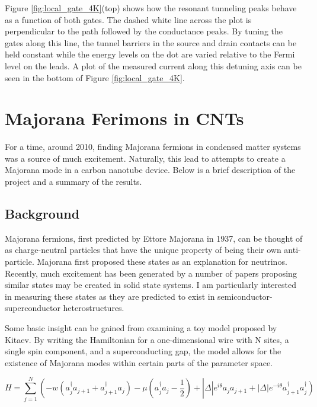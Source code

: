 Figure \ref{fig:local_gate_4K}(top) shows how the resonant tunneling peaks behave as a function of both gates. The dashed white line across the plot is perpendicular to the path followed by the conductance peaks. By tuning the gates along this line, the tunnel barriers in the source and drain contacts can be held constant while the energy levels on the dot are varied relative to the Fermi level on the leads. A plot of the measured current along this detuning axis can be seen in the bottom of Figure \ref{fig:local_gate_4K}.

\section{Majorana Ferimons in CNTs}

For a time, around 2010, finding Majorana fermions in condensed matter systems was a source of much excitement. Naturally, this lead to attempts to create a Majorana mode in a carbon nanotube device. Below is a brief description of the project and a summary of the results.

\subsection{Background}

Majorana fermions, first predicted by Ettore Majorana in 1937\cite{Majorana1937}, can be thought of as charge-neutral particles that have the unique property of being their own anti-particle. Majorana first proposed these states as an explanation for neutrinos. Recently, much excitement has been generated by a number of papers proposing similar states may be created in solid state systems\cite{Lutchyn2010, Alicea2010}. I am particularly interested in measuring these states as they are predicted to exist in semiconductor-superconductor heterostructures.

Some basic insight can be gained from examining a toy model proposed by Kitaev\cite{Kitaev2001}.  By writing the Hamiltonian for a one-dimensional wire with N sites, a single spin component, and a superconducting gap, the model allows for the existence of Majorana modes within certain parts of the parameter space.  

\begin{equation}
	H = \sum_{j=1}^{N}\left(-w\left(a_j^\dagger a_{j+1}+a_{j+1}^\dagger a_j\right)-\mu\left( a_j^\dagger a_{j} -\frac{1}{2}\right) + \right| \Delta \left| e^{i\theta} a_ja_{j+1} + \left|\Delta\right|e^{-i\theta} a_{j+1}^\dagger a_j^\dagger\right)
\end{equation}

